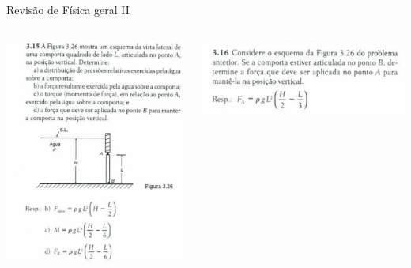 \documentclass[t,%
brazilian,%
11pt,%
aspectratio=169,%
table%
]{beamer}
\begin{document}
\begin{frame}{Revisão de Física geral II}
    \begin{columns}[T]
        \begin{column}{0.45\textwidth}
            \includegraphics[height=\textheight-35pt]{images/Captura de tela de 2025-04-08 17-56-49.png}
        \end{column}
        \begin{column}{0.45\textwidth}
            \includegraphics[width=\textwidth]{images/Captura de tela de 2025-04-09 16-46-12.png}
        \end{column}
    \end{columns}
\end{frame}
\end{document}
